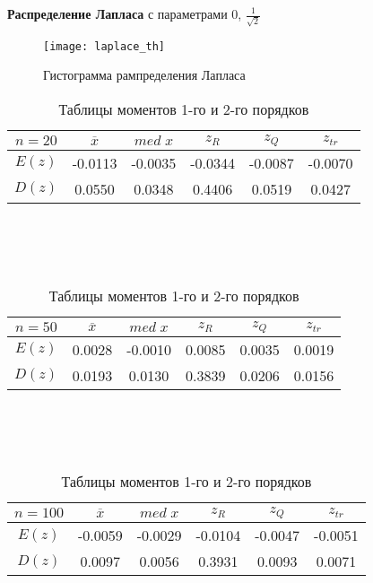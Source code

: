 \documentclass[12pt]{article}
\begin{document}
\newpage
\textbf{Распределение Лапласа} с параметрами 0, $\frac{1}{\sqrt{2}}$

\begin{figure}[h!]
	\centering
	\texttt{[image: laplace\_th]}
	\caption{Гистограмма рампределения Лапласа}
	\label{4_pic:1}
\end{figure}

\begin{table}[h!]
	\begin{tabular}{ | c | c | c | c | c | c |}
	\hline
	$n = 20$ & $\overline{x}$ & $med\;x$ & $z_R$ & $z_Q$ & $z_{tr}$ \\ \hline
	$E(z)$ & -0.0113 & -0.0035 & -0.0344 & -0.0087 & -0.0070 \\ \hline
	$D(z)$ & 0.0550 & 0.0348 & 0.4406 & 0.0519 & 0.0427 \\ \hline
	\end{tabular}
	\\
	\\ \\ 
	\begin{tabular}{ | c | c | c | c | c | c |}
	\hline
	$n = 50$ & $\overline{x}$ & $med\;x$ & $z_R$ & $z_Q$ & $z_{tr}$ \\ \hline
	$E(z)$ & 0.0028 & -0.0010 & 0.0085 & 0.0035 & 0.0019 \\ \hline
	$D(z)$ & 0.0193 & 0.0130 & 0.3839 & 0.0206 & 0.0156 \\ \hline
	\end{tabular}
	\\
	\\ \\ 
	\begin{tabular}{ | c | c | c | c | c | c |}
	\hline
	$n = 100$ & $\overline{x}$ & $med\;x$ & $z_R$ & $z_Q$ & $z_{tr}$ \\ \hline
	$E(z)$ & -0.0059 & -0.0029 & -0.0104 & -0.0047 & -0.0051 \\ \hline
	$D(z)$ & 0.0097 & 0.0056 & 0.3931 & 0.0093 & 0.0071 \\ \hline
	\end{tabular}
	\caption*{Таблицы моментов 1-го и 2-го порядков}
	\indent{}\\
\end{table}

\begin{center}
\end{center}
\end{document}
